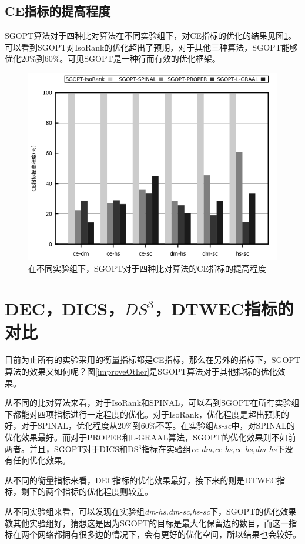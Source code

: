 \subsection{CE指标的提高程度}
SGOPT算法对于四种比对算法在不同实验组下，对CE指标的优化的结果见图\ref{improveCE}。可以看到SGOPT对IsoRank的优化超出了预期，对于其他三种算法，SGOPT能够优化20\%到60\%。可见SGOPT是一种行而有效的优化框架。
\begin{figure}[!htbp]
    \centering
    \includegraphics[width=0.8\linewidth]{pic/improveCE.png}
    \caption{在不同实验组下，SGOPT对于四种比对算法的CE指标的提高程度}
    \label{improveCE}
\end{figure}

\section{DEC，DICS，$DS^3$，DTWEC指标的对比}
目前为止所有的实验采用的衡量指标都是CE指标，那么在另外的指标下，SGOPT算法的效果又如何呢？图\ref{improveOther}是SGOPT算法对于其他指标的优化效果。

从不同的比对算法来看，对于IsoRank和SPINAL，可以看到SGOPT在所有实验组下都能对四项指标进行一定程度的优化。对于IsoRank，优化程度是超出预期的好，对于SPINAL，优化程度从20\%到60\%不等。在实验组\textit{hs-sc}中，对SPINAL的优化效果最好。而对于PROPER和L-GRAAL算法，SGOPT的优化效果则不如前两者。并且，SGOPT对于DICS和DS$^3$指标在实验组\textit{ce-dm,ce-hs,ce-hs,dm-hs}下没有任何优化效果。

从不同的衡量指标来看，DEC指标的优化效果最好，接下来的则是DTWEC指标，剩下的两个指标的优化程度则较差。

从不同实验组来看，可以发现在实验组\textit{dm-hs,dm-sc,hs-sc}下，SGOPT的优化效果教其他实验组好，猜想这是因为SGOPT的目标是最大化保留边的数目，而这一指标在两个网络都拥有很多边的情况下，会有更好的优化空间，所以结果也会较好。

